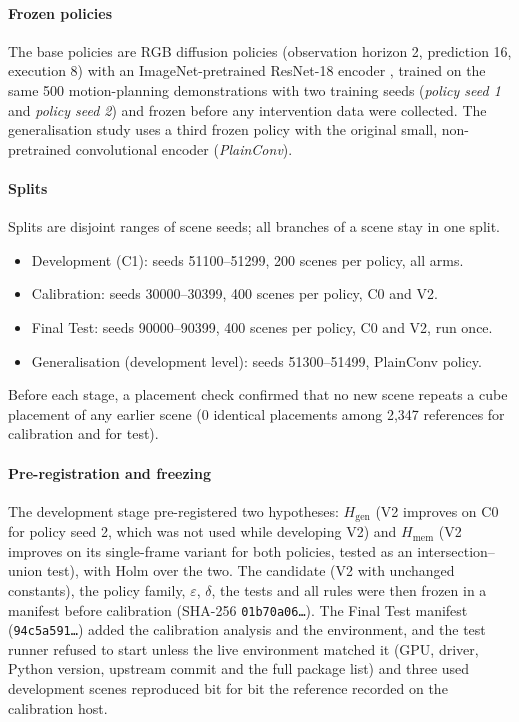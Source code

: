 \documentclass[preprint,12pt]{elsarticle}
\begin{document}
\paragraph{Frozen policies} The base policies are RGB diffusion policies \cite{chi2023diffusion} (observation horizon 2, prediction 16, execution 8) with an ImageNet-pretrained ResNet-18 encoder \cite{he2016resnet}, trained on the same 500 motion-planning demonstrations with two training seeds (\emph{policy seed 1} and \emph{policy seed 2}) and frozen before any intervention data were collected. The generalisation study uses a third frozen policy with the original small, non-pretrained convolutional encoder (\emph{PlainConv}).

\paragraph{Splits} Splits are disjoint ranges of scene seeds; all branches of a scene stay in one split.
\begin{itemize}
\item Development (C1): seeds 51100--51299, 200 scenes per policy, all arms.
\item Calibration: seeds 30000--30399, 400 scenes per policy, C0 and V2.
\item Final Test: seeds 90000--90399, 400 scenes per policy, C0 and V2, run once.
\item Generalisation (development level): seeds 51300--51499, PlainConv policy.
\end{itemize}
Before each stage, a placement check confirmed that no new scene repeats a cube placement of any earlier scene (0 identical placements among 2,347 references for calibration and for test).

\paragraph{Pre-registration and freezing} The development stage pre-registered two hypotheses: $H_{\mathrm{gen}}$ (V2 improves on C0 for policy seed 2, which was not used while developing V2) and $H_{\mathrm{mem}}$ (V2 improves on its single-frame variant for both policies, tested as an intersection--union test), with Holm over the two. The candidate (V2 with unchanged constants), the policy family, $\varepsilon$, $\delta$, the tests and all rules were then frozen in a manifest before calibration (SHA-256 \texttt{01b70a06\ldots}). The Final Test manifest (\texttt{94c5a591\ldots}) added the calibration analysis and the environment, and the test runner refused to start unless the live environment matched it (GPU, driver, Python version, upstream commit and the full package list) and three used development scenes reproduced bit for bit the reference recorded on the calibration host.
\end{document}
